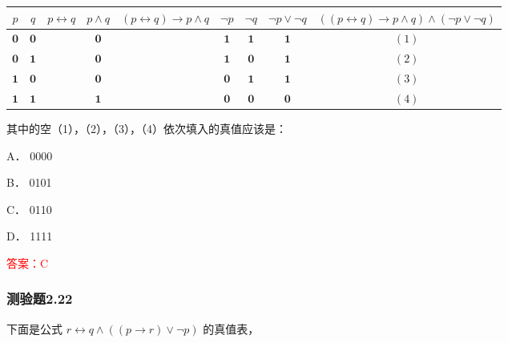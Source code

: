 \documentclass[UTF8, heading=true]{ctexart}
\begin{document}
\clearpage

\begin{table}[htbp]
  \centering
  \renewcommand{\arraystretch}{1.2}
\begin{tabular}{c|c|c|c|c|c|c|c|c}
\hline$p$ & $q$ & $p \leftrightarrow q$ & $p \wedge q$ & $(p \leftrightarrow q) \rightarrow p \wedge q$ & $\neg p$ & $\neg q$ & $\neg p \vee \neg q$ & $((p \leftrightarrow q) \rightarrow p \wedge q) \wedge(\neg p \vee \neg q)$ \\
\hline $\mathbf{0}$ & $\mathbf{0}$ & & $\mathbf{0}$ & & $\mathbf{1}$ & $\mathbf{1}$ & $\mathbf{1}$ & ${(1)}$ \\
\hline $\mathbf{0}$ & $\mathbf{1}$ & & $\mathbf{0}$ & & $\mathbf{1}$ & $\mathbf{0}$ & $\mathbf{1}$ & $(2)$ \\
\hline $\mathbf{1}$ & $\mathbf{0}$ & & $\mathbf{0}$ & & $\mathbf{0}$ & $\mathbf{1}$ & $\mathbf{1}$ & ${(3)}$ \\
\hline $\mathbf{1}$ & $\mathbf{1}$ & & $\mathbf{1}$ & & $\mathbf{0}$ & $\mathbf{0}$ & $\mathbf{0}$ & ${(4)}$ \\
\hline
\end{tabular}
\end{table}

其中的空（1），（2），（3），（4）依次填入的真值应该是： $\qquad$


A． 0000

B． 0101

C． 0110

D． 1111

\textcolor{red}{答案：C}

\subsubsection{测验题2.22}

下面是公式 $r \leftrightarrow q \wedge((p \rightarrow r) \vee \neg p)$ 的真值表，
\end{document}
